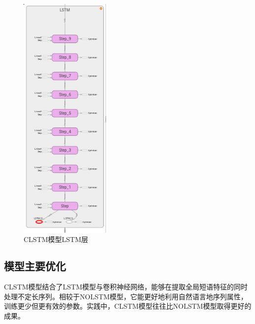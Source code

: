 \begin{figure}[!hbp]
\begin{center}
\includegraphics[width=0.4\textwidth]{graphic/clstm2.png}
\caption{CLSTM模型LSTM层 \label{clstm2}}
\end{center}
\end{figure}
\subsection{模型主要优化}
CLSTM模型结合了LSTM模型与卷积神经网络，能够在提取全局短语特征的同时处理不定长序列。相较于NOLSTM模型，它能更好地利用自然语言地序列属性，训练更少但更有效的参数。实践中，CLSTM模型往往比NOLSTM模型取得更好的成果。